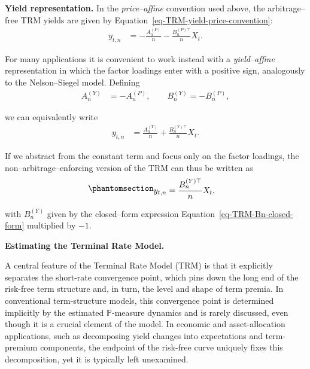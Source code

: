 \documentclass[
  letterpaper,
  DIV=11,
  numbers=noendperiod]{scrreprt}
\begin{document}
\textbf{Yield representation.} In the \emph{price--affine} convention
used above, the arbitrage--free TRM yields are given by
Equation~\ref{eq-TRM-yield-price-convention}:
\begin{align}
y_{t,n}
&= -\frac{A_n^{(P)}}{n} - \frac{B_n^{(P)\top}}{n} X_t.
\end{align}

For many applications it is convenient to work instead with a
\emph{yield--affine} representation in which the factor loadings enter
with a positive sign, analogously to the Nelson--Siegel model. Defining
\begin{align}
A_n^{(Y)} &= -A_n^{(P)}, \qquad
B_n^{(Y)} = -B_n^{(P)},
\end{align}

we can equivalently write
\begin{align}
y_{t,n}
&= \frac{A_n^{(Y)}}{n} + \frac{B_n^{(Y)\top}}{n} X_t.
\end{align}

If we abstract from the constant term and focus only on the factor
loadings, the non--arbitrage--enforcing version of the TRM can thus be
written as
\begin{equation}\protect\phantomsection\label{eq-TRM-yield-reduced-form}{
\begin{align}
y_{t,n}
&= \frac{B_n^{(Y)\top}}{n} X_t,
\end{align}
}\end{equation}

with \(B_n^{(Y)}\) given by the closed--form expression
Equation~\ref{eq-TRM-Bn-closed-form} multiplied by \(-1\).

\textbf{Estimating the Terminal Rate Model.}

A central feature of the Terminal Rate Model (TRM) is that it explicitly
separates the short-rate convergence point, which pins down the long end
of the risk-free term structure and, in turn, the level and shape of
term premia. In conventional term-structure models, this convergence
point is determined implicitly by the estimated \(\mathbb{P}\)-measure
dynamics and is rarely discussed, even though it is a crucial element of
the model. In economic and asset-allocation applications, such as
decomposing yield changes into expectations and term-premium components,
the endpoint of the risk-free curve uniquely fixes this decomposition,
yet it is typically left unexamined.
\end{document}
